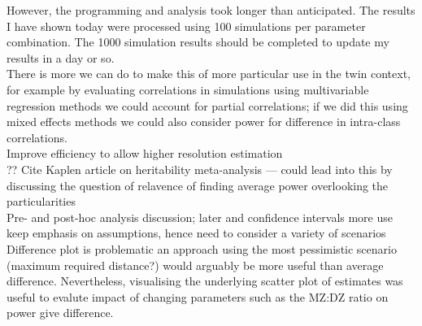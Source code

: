 However, the programming and analysis took longer than anticipated.  The results I have shown today were processed using 100 simulations per parameter combination.  The 1000 simulation results should be completed to update my results in a day or so.
\\
There is more we can do to make this of more particular use in the twin context, for example by evaluating correlations in simulations using multivariable regression methods we could account for partial correlations; if we did this using mixed effects methods we could also consider power for difference in intra-class correlations.
\\
Improve efficiency to allow higher resolution estimation
\\

??
Cite Kaplen article on heritability meta-analysis --- could lead into this by discussing the question of relavence of finding average power overlooking the particularities
\\
Pre- and post-hoc analysis discussion; later and confidence intervals more use
\\
keep emphasis on assumptions, hence need to consider a variety of scenarios
\\

Difference plot is problematic \; an approach using the most pessimistic scenario (maximum required distance?) would arguably be more useful than average difference.  Nevertheless, visualising the underlying scatter plot of estimates was useful to evalute impact of changing parameters such as the MZ:DZ ratio on power give difference.